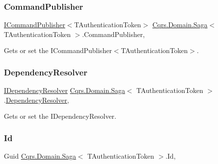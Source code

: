 \subsubsection{\texorpdfstring{Command\+Publisher}{CommandPublisher}}
{\footnotesize\ttfamily \hyperlink{interfaceCqrs_1_1Commands_1_1ICommandPublisher}{I\+Command\+Publisher}$<$T\+Authentication\+Token$>$ \hyperlink{classCqrs_1_1Domain_1_1Saga}{Cqrs.\+Domain.\+Saga}$<$ T\+Authentication\+Token $>$.Command\+Publisher\hspace{0.3cm}{\ttfamily [get]}, {\ttfamily [protected]}}



Gets or set the I\+Command\+Publisher$<$\+T\+Authentication\+Token$>$. 

\mbox{\label{classCqrs_1_1Domain_1_1Saga_afd8b9bae392272e1651f2ea53c65db12_afd8b9bae392272e1651f2ea53c65db12}} 
\subsubsection{\texorpdfstring{Dependency\+Resolver}{DependencyResolver}}
{\footnotesize\ttfamily \hyperlink{interfaceCqrs_1_1Configuration_1_1IDependencyResolver}{I\+Dependency\+Resolver} \hyperlink{classCqrs_1_1Domain_1_1Saga}{Cqrs.\+Domain.\+Saga}$<$ T\+Authentication\+Token $>$.\hyperlink{classCqrs_1_1Configuration_1_1DependencyResolver}{Dependency\+Resolver}\hspace{0.3cm}{\ttfamily [get]}, {\ttfamily [protected]}}



Gets or set the I\+Dependency\+Resolver. 

\mbox{\label{classCqrs_1_1Domain_1_1Saga_af6b9552a90fcbe5c101c413126256565_af6b9552a90fcbe5c101c413126256565}} 
\subsubsection{\texorpdfstring{Id}{Id}}
{\footnotesize\ttfamily Guid \hyperlink{classCqrs_1_1Domain_1_1Saga}{Cqrs.\+Domain.\+Saga}$<$ T\+Authentication\+Token $>$.Id\hspace{0.3cm}{\ttfamily [get]}, {}}



